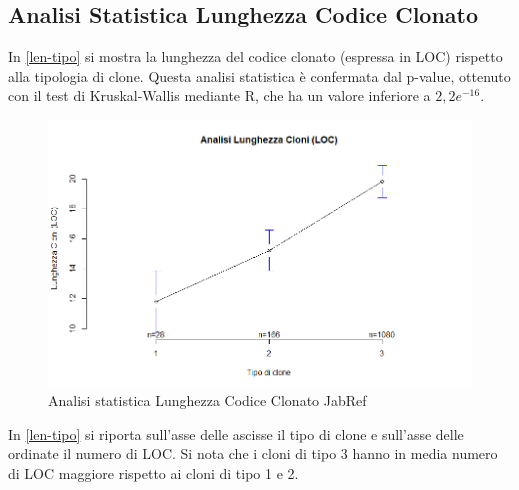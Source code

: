 \subsection{Analisi Statistica Lunghezza Codice Clonato}
In \autoref{len-tipo} si mostra la lunghezza del codice clonato (espressa in LOC) rispetto alla tipologia di clone. Questa analisi statistica è confermata dal p-value, ottenuto con il test di Kruskal-Wallis mediante R, che ha un valore inferiore a $2,2 e^{-16}$. \newpage
\begin{figure}[htbp]
	\centering
	\includegraphics[scale=0.5]{analisi_R/AnalisiJabref/3-gplot-len-type.png}
\caption{Analisi statistica Lunghezza Codice Clonato JabRef}
\label{len-tipo}
\end{figure}

In \autoref{len-tipo} si riporta sull'asse delle ascisse il tipo di clone e sull'asse delle ordinate il numero di LOC. Si nota che i cloni di tipo 3 hanno in media numero di LOC maggiore rispetto ai cloni di tipo 1 e 2.
